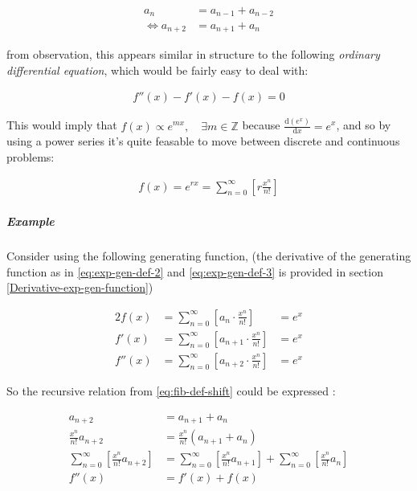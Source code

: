 \documentclass[11pt]{article}
\begin{document}
\begin{align}
    a_{n}&= a_{n - 1} + a_{n - 2} \nonumber \\
\iff a_{n+  2} &= a_{n+  1} +  a_n \label{eq:fib-def-shift}
\end{align}


from observation, this appears similar in structure to the following \emph{ordinary
differential equation}, which would be fairly easy to deal with:


\begin{align*}
f''\left( x \right)- f'\left( x \right)- f\left( x \right)=  0
\end{align*}


This would imply that \(f\left( x \right) \propto e^{mx}, \quad \exists m \in \mathbb{Z}\) because
\(\frac{\mathrm{d}\left( e^x \right) }{\mathrm{d} x} = e^x\), and so by using a power series it's quite feasable to move between discrete and continuous problems:


\begin{align*}
f\left( x \right)= e^{rx} = \sum^{\infty}_{n= 0}   \left[ r \frac{x^n}{n!} \right]
\end{align*}

\subparagraph{Example}
\label{solving-the-sequence}
Consider using the following generating function, (the derivative of the
generating function as in \eqref{eq:exp-gen-def-2} and \eqref{eq:exp-gen-def-3} is
provided in section \ref{Derivative-exp-gen-function})




\begin{alignat}{2}
    f \left( x \right) &=  \sum^{\infty}_{n= 0}   \left[ a_{n} \cdot  \frac{x^n}{n!} \right]   &= e^x \label{eq:exp-gen-def-1} \\
    f'\left( x \right) &=  \sum^{\infty}_{n= 0}   \left[ a_{n+1} \cdot  \frac{x^n}{n!} \right]  &= e^x  \label{eq:exp-gen-def-2} \\
    f''\left( x \right) &=  \sum^{\infty}_{n= 0}   \left[ a_{n+2} \cdot  \frac{x^n}{n!} \right] &= e^x  \label{eq:exp-gen-def-3}
\end{alignat}


So the recursive relation from \eqref{eq:fib-def-shift}  could be expressed :


\begin{align*}
a_{n+  2}    &= a_{n+  1} +  a_{n}\\
\frac{x^n}{n!}   a_{n+  2}    &= \frac{x^n}{n!}\left( a_{n+  1} +  a_{n}  \right)\\
\sum^{\infty}_{n= 0} \left[ \frac{x^n}{n!}   a_{n+  2} \right]        &= \sum^{\infty}_{n= 0}   \left[ \frac{x^n}{n!} a_{n+  1} \right]  + \sum^{\infty}_{n= 0}   \left[ \frac{x^n}{n!} a_{n}  \right]  \\
f''\left( x \right) &= f'\left( x \right)+  f\left( x \right)
\end{align*}
\end{document}
